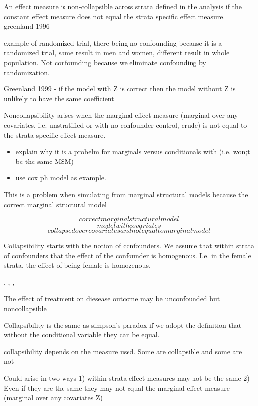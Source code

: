 \documentclass[11pt]{article}
\providecommand{\tightlist}{%
      \setlength{\itemsep}{0pt}\setlength{\parskip}{0pt}}
\begin{document}
An effect measure is non-collapsible across strata defined in the
analysis if the constant effect measure does not equal the strata
specific effect measure. greenland 1996

example of randomized trial, there being no confounding because it is a
randomized trial, same result in men and women, different result in
whole population. Not confounding because we eliminate confounding by
randomization.

Greenland 1999 - if the model with Z is correct then the model without Z
is unlikely to have the same coefficient

Noncollapsibility arises when the marginal effect measure (marginal over
any covariates, i.e. unstratified or with no confounder control, crude)
is not equal to the strata specific effect measure.

\begin{itemize}
\tightlist
\item
  explain why it is a probelm for marginals versus conditionals with
  (i.e. won;t be the same MSM)
\item
  use cox ph model as example.
\end{itemize}

This is a problem when simulating from marginal structural models
because the correct marginal structural model

\[correct marginal structural model\] \[model with covariates\]
\[collapsed over covariates and not equal to marginal model\]

Collapsibility starts with the notion of confounders. We assume that
within strata of confounders that the effect of the confounder is
homogenous. I.e. in the female strata, the effect of being female is
homogenous.

\citet{Greenland1996}, \citet{Greenland1999}, \citet{Greenland2011},
\citet{Sjoelander2016}

The effect of treatment on diesease outcome may be unconfounded but
noncollapsible

Collapsibility is the same as simpson's paradox if we adopt the
definition that without the conditional variable they can be equal.

collapsibility depends on the measure used. Some are collapsible and
some are not

Could arise in two ways 1) within strata effect measures may not be the
same 2) Even if they are the same they may not equal the marginal effect
measure (marginal over any covariates Z)
\end{document}
